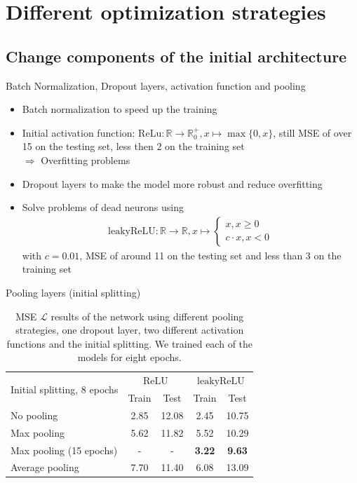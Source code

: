 \section{Different optimization strategies}
\subsection{Change components of the initial architecture}

\begin{frame}{Batch Normalization, Dropout layers, activation function and pooling}
	\begin{itemize}
		\item Batch normalization to speed up the training \cite{BatchNorm2015}
		\item Initial activation function: $\mathrm{ReLu}: \mathbb{R} \to \mathbb{R}_0^+, x \mapsto \max\{0,x\}$, still MSE of over 15 on the testing 
		set, less then 2 on the training set\\
		$\Rightarrow$ Overfitting problems
		\item Dropout layers \cite{Dropout2014} to make the model more robust and reduce overfitting
		\item Solve problems of dead neurons using
		\begin{align*}
		\mathrm{leakyReLU} : \mathbb{R} \to \mathbb{R}, x \mapsto \begin{cases}
		x, x \geq 0\\
		c \cdot x, x <0
		\end{cases}
		\end{align*}
		with $c = 0.01$, MSE of around 11 on the testing set and less than 3 on the training set
	\end{itemize}
\end{frame}

\begin{frame}{Pooling layers (initial splitting)}
	\begin{table}[!t]
		\normalsize
		\centering
		\begin{tabular}{lcccc}
			\toprule
			\multirow{2}{*}{Initial splitting, 8 epochs}  & \multicolumn{2}{c}{$\mathrm{ReLU}$} & \multicolumn{2}{c}{$\mathrm{leakyReLU}$} \\
			& Train & Test & Train & Test\\
			\midrule
			No pooling & 2.85 & 12.08 & 2.45 & 10.75 \\
			Max pooling & 5.62 & 11.82 & 5.52 & 10.29 \\
			Max pooling (15 epochs) & - & - & \textbf{3.22} & \textbf{9.63} \\
			Average pooling & 7.70 & 11.40 & 6.08 & 13.09\\
			\bottomrule
		\end{tabular}
		\caption{MSE $\mathcal{L}$ results of the network using different pooling strategies, one dropout layer, two different activation functions and 
			the initial splitting. We trained each of the models for eight epochs.}
	\end{table}
\end{frame}

